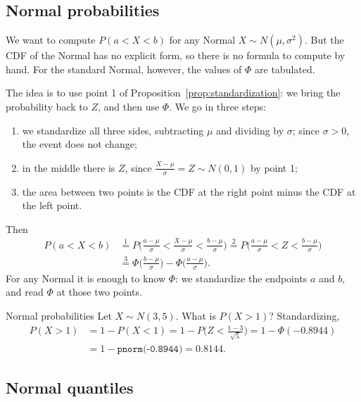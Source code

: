 \documentclass[a4paper,12pt,oneside]{report}
\begin{document}
\begin{studylater}
\subsection{Normal probabilities}

We want to compute $P(a<X<b)$ for any Normal $X\sim N(\mu,\sigma^2)$. But
the CDF of the Normal has no explicit form, so there is no formula to compute
by hand. For the standard Normal, however, the values of $\Phi$ are
tabulated.

The idea is to use point 1 of
Proposition~\ref{prop:standardization}: we bring the probability back to $Z$,
and then use $\Phi$. We go in three steps:
\begin{enumerate}
\item we standardize all three sides, subtracting $\mu$ and dividing by
$\sigma$; since $\sigma>0$, the event does not change;
\item in the middle there is $Z$, since $\frac{X-\mu}{\sigma}=Z\sim N(0,1)$
by point 1;
\item the area between two points is the CDF at the right point minus the CDF
at the left point.
\end{enumerate}
Then
\begin{align*}
P(a<X<b)
&\overset{1}{=}P\Big(\frac{a-\mu}{\sigma}<\frac{X-\mu}{\sigma}<\frac{b-\mu}{\sigma}\Big)
\overset{2}{=}P\Big(\frac{a-\mu}{\sigma}<Z<\frac{b-\mu}{\sigma}\Big)\\
&\overset{3}{=}\Phi\Big(\frac{b-\mu}{\sigma}\Big)-\Phi\Big(\frac{a-\mu}{\sigma}\Big).
\end{align*}
For any Normal it is enough to know $\Phi$: we standardize the endpoints $a$
and $b$, and read $\Phi$ at those two points.

\begin{framedexample}{Normal probabilities}
Let $X\sim N(3,5)$. What is $P(X>1)$? Standardizing,
\begin{align*}
P(X>1)&=1-P(X<1)=1-P\Big(Z<\frac{1-3}{\sqrt5}\Big)=1-\Phi(-0.8944)\\
&=1-\texttt{pnorm(-0.8944)}=0.8144 .
\end{align*}
\end{framedexample}

\subsection{Normal quantiles}


\end{studylater}
\end{document}
